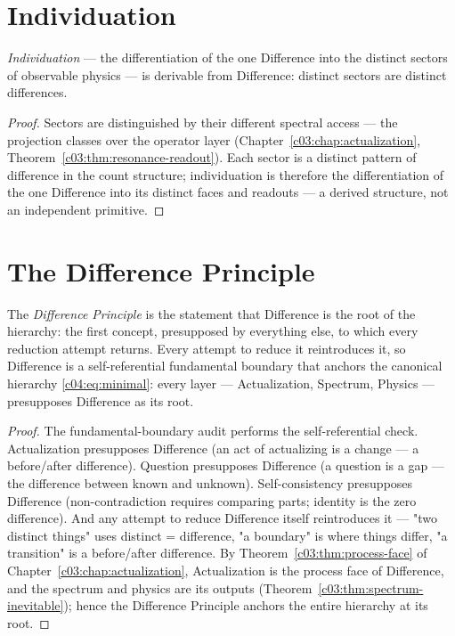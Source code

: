 \section{Individuation}
\label{c04:sec:individuation}

\begin{theorem}
\label{c04:thm:individuation}
\emph{Individuation} --- the differentiation of the one Difference into the distinct sectors
of observable physics --- is derivable from Difference: distinct sectors are distinct
differences.
\end{theorem}

\begin{proof}
Sectors are distinguished by their different spectral access --- the projection classes over
the operator layer (Chapter~\ref{c03:chap:actualization}, Theorem~\ref{c03:thm:resonance-readout}).
Each sector is a distinct pattern of difference in
the count structure; individuation is therefore the differentiation of the one Difference
into its distinct faces and readouts --- a derived structure, not an independent primitive.
\end{proof}

\section{The Difference Principle}
\label{c04:sec:difference-principle}

\begin{theorem}
\label{c04:thm:difference-first}
The \emph{Difference Principle} is the statement that Difference is the root of the
hierarchy: the first concept, presupposed by everything else, to which every reduction
attempt returns. Every attempt to reduce it reintroduces it, so Difference is a
self-referential fundamental boundary that anchors the canonical hierarchy
\eqref{c04:eq:minimal}: every layer --- Actualization, Spectrum, Physics --- presupposes
Difference as its root.
\end{theorem}

\begin{proof}
The fundamental-boundary audit \cite{c04:QG278} performs the self-referential check. Actualization
presupposes Difference (an act of actualizing is a change --- a before/after difference).
Question presupposes Difference (a question is a gap --- the difference between known and
unknown). Self-consistency presupposes Difference (non-contradiction requires comparing
parts; identity is the zero difference). And any attempt to reduce Difference itself
reintroduces it --- "two distinct things" uses distinct = difference, "a boundary" is where
things differ, "a transition" is a before/after difference. By
Theorem~\ref{c03:thm:process-face} of Chapter~\ref{c03:chap:actualization}, Actualization is
the process face of Difference, and the spectrum and physics are its outputs
(Theorem~\ref{c03:thm:spectrum-inevitable}); hence the Difference Principle anchors the entire
hierarchy at its root.
\end{proof}

